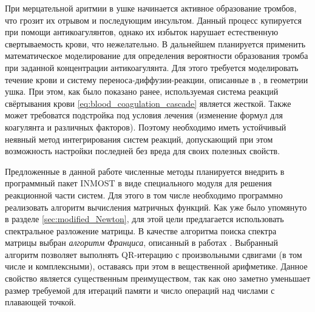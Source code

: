 При мерцательной аритмии в ушке начинается активное образование тромбов,
что грозит их отрывом и последующим инсультом.
Данный процесс купируется при помощи антикоагулянтов,
однако их избыток нарушает естественную свертываемость крови, что нежелательно.
В дальнейшем планируется применить математическое моделирование для определения
вероятности образования тромба при заданной концентрации антикоагулянта.
Для этого требуется моделировать течение крови и систему переноса-диффузии-реакции,
описанные в \cite{vassilevski2020parallel}, в геометрии ушка.
При этом, как было показано ранее, используемая система реакций свёртывания крови \eqref{eq:blood_coagulation_cascade} является жесткой.
Также может требоватся подстройка под условия лечения (изменение формул для коагулянта и различных факторов).
Поэтому необходимо иметь устойчивый неявный метод интегрирования систем реакций,
допускающий при этом возможность настройки последней без вреда для своих полезных свойств.

Предложенные в данной работе численные методы планируется внедрить в программный пакет INMOST \cite{vassilevski2020parallel}
в виде специального модуля для решения реакционной части систем.
Для этого в том числе необходимо программно реализовать алгоритм вычисления матричных функций.
Как уже было упомянуто в разделе \ref{sec:modified_Newton},
для этой цели предлагается использовать спектральное разложение матрицы.
В качестве алгоритма поиска спектра матрицы выбран \emph{алгоритм Франциса},
описанный в работах \cite{francis1961first, francis1962second}.
Выбранный алгоритм позволяет выполнять QR-итерацию с произвольными сдвигами (в том числе и комплексными),
оставаясь при этом в вещественной арифметике.
Данное свойство является существенным преимуществом,
так как оно заметно уменьшает размер требуемой для итераций памяти и число операций над числами с плавающей точкой.
